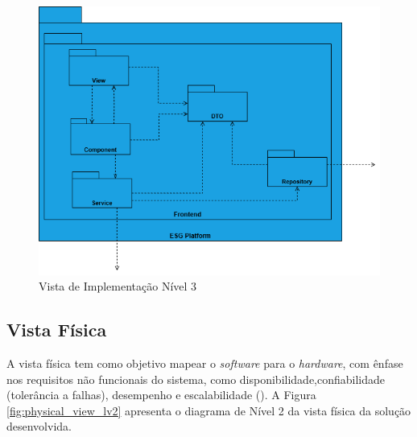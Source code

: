 \begin{figure}[H]
    \centering
    \includegraphics[width=5.25in,keepaspectratio]{frontmatter/assets/diagrams/Development View/Implementation Lv3.drawio.png}
    \caption{Vista de Implementação Nível 3}
    \label{fig:development_view_lv3}
\end{figure}
    
\subsection{Vista Física}

A vista física tem como objetivo mapear o \textit{software} para o \textit{hardware}, com ênfase nos requisitos não funcionais do sistema, como disponibilidade,confiabilidade (tolerância a falhas), desempenho e escalabilidade (\cite{Kruchten1995}). A Figura \ref{fig:physical_view_lv2} apresenta o diagrama de Nível 2 da vista física da solução desenvolvida.

